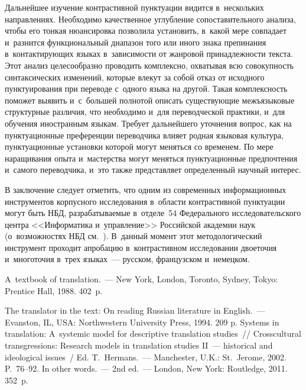 \begin{multicols}{2}
  Дальнейшее изучение контрастивной пунктуации видится в~нескольких 
направлениях. Необходимо качественное углубление со\-по\-ста\-ви\-тель\-но\-го 
анализа, чтобы его тонкая нюансировка \mbox{поз\-во\-ли\-ла} установить, в~какой мере 
совпадает и~разнится функциональный диапазон того или иного знака 
препинания в~кон\-так\-ти\-ру\-ющих языках в~за\-ви\-си\-мости от жанровой 
при\-над\-леж\-ности текс\-та. Этот анализ целесообразно проводить комплексно, 
охватывая всю со\-во\-куп\-ность синтаксических изменений, которые влекут за 
собой отказ от исходного пунктуирования при переводе с~одного языка на 
другой. Такая ком\-плекс\-ность поможет выявить и~с~большей пол\-но\-той 
описать су\-щест\-ву\-ющие межъ\-язы\-ко\-вые структурные различия, что 
необходимо и~для переводческой практики, и~для обуче\-ния иностранным 
языкам. Требует дальнейшего уточ\-не\-ния вопрос, как на пунктуационные 
преференции переводчика влияет род\-ная языковая культура, 
пунктуационные уста\-нов\-ки которой могут меняться со временем. По мере 
наращивания опыта и~мастерства могут меняться пунктуационные 
предпочтения и~самого переводчика, и~это так\-же пред\-став\-ля\-ет определенный 
научный интерес.
  
  В заключение следует отметить, что одним из современных 
информационных инструментов корпусного исследования в~об\-ласти 
контрастивной пунктуации могут быть НБД, 
раз\-ра\-ба\-ты\-ва\-емые в~отделе~54 Федерального исследовательского цент\-ра 
<<Информатика и~управ\-ле\-ние>> Российской академии наук (о~возможностях 
НБД см.~\cite{6-nu}). В~данный момент этот методологический инструмент 
проходит апро\-ба\-цию в~контрастивном исследовании двоеточия и~многоточия в~трех языках~--- русском, французском и~немецком.

\vspace*{-9pt}
  
{\small\frenchspacing
 {\baselineskip=11.5pt
 \begin{thebibliography}{99}
 
 \vspace*{-3pt}
 
 A~textbook of translation.~--- New York, London, Toronto, Sydney, Tokyo: Prentice 
Hall, 1988. 402~p.
 

 The translator in the text: On reading Russian literature in English.~--- Evanston, IL, USA: 
Northwestern University Press, 1994. 209 p.
 Systems in translation: A~systemic model for descriptive translation studies~// 
Crosscultural transgressions: Research models in translation studies II~--- historical and 
ideological issues~/ Ed. T.~Hermans.~---  Manchester, U.K.: St.\ Jerome, 2002. P.~76--92.
 In other words.~--- 2nd ed.~--- London, New York: Routledge, 2011. 352~p.


\end{thebibliography}}}
\end{multicols}
